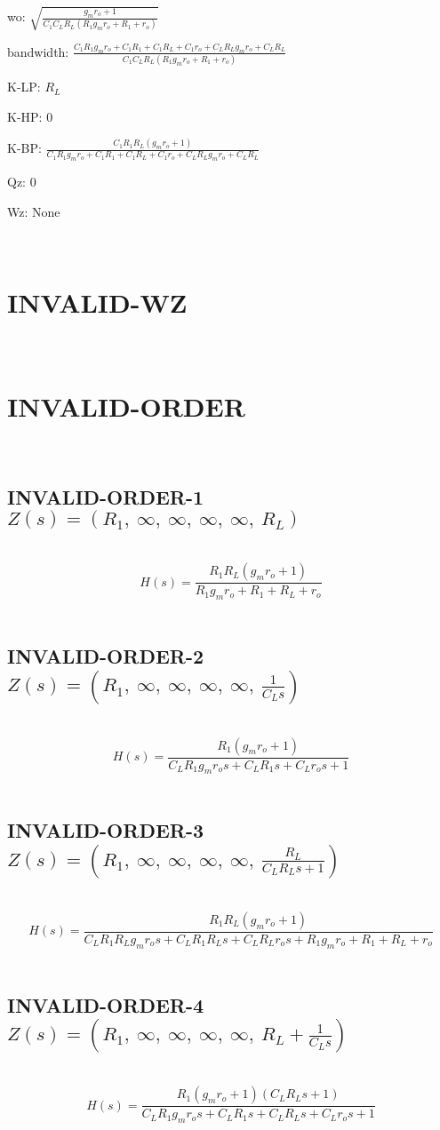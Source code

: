 \documentclass{article}
\begin{document}
wo: $\sqrt{\frac{g_{m} r_{o} + 1}{C_{1} C_{L} R_{L} \left(R_{1} g_{m} r_{o} + R_{1} + r_{o}\right)}}$\ 

bandwidth: $\frac{C_{1} R_{1} g_{m} r_{o} + C_{1} R_{1} + C_{1} R_{L} + C_{1} r_{o} + C_{L} R_{L} g_{m} r_{o} + C_{L} R_{L}}{C_{1} C_{L} R_{L} \left(R_{1} g_{m} r_{o} + R_{1} + r_{o}\right)}$\ 

K-LP: $R_{L}$\ 

K-HP: $0$\ 

K-BP: $\frac{C_{1} R_{1} R_{L} \left(g_{m} r_{o} + 1\right)}{C_{1} R_{1} g_{m} r_{o} + C_{1} R_{1} + C_{1} R_{L} + C_{1} r_{o} + C_{L} R_{L} g_{m} r_{o} + C_{L} R_{L}}$\ 

Qz: $0$\ 

Wz: $\text{None}$\ 

\ 

\section{INVALID-WZ}\ 
\section{INVALID-ORDER}\ 
\subsection{INVALID-ORDER-1 $Z(s) = \left( R_{1}, \  \infty, \  \infty, \  \infty, \  \infty, \  R_{L}\right)$ } \ 
\textbf{\[H(s) = \frac{R_{1} R_{L} \left(g_{m} r_{o} + 1\right)}{R_{1} g_{m} r_{o} + R_{1} + R_{L} + r_{o}}\] } \ 
\subsection{INVALID-ORDER-2 $Z(s) = \left( R_{1}, \  \infty, \  \infty, \  \infty, \  \infty, \  \frac{1}{C_{L} s}\right)$ } \ 
\textbf{\[H(s) = \frac{R_{1} \left(g_{m} r_{o} + 1\right)}{C_{L} R_{1} g_{m} r_{o} s + C_{L} R_{1} s + C_{L} r_{o} s + 1}\] } \ 
\subsection{INVALID-ORDER-3 $Z(s) = \left( R_{1}, \  \infty, \  \infty, \  \infty, \  \infty, \  \frac{R_{L}}{C_{L} R_{L} s + 1}\right)$ } \ 
\textbf{\[H(s) = \frac{R_{1} R_{L} \left(g_{m} r_{o} + 1\right)}{C_{L} R_{1} R_{L} g_{m} r_{o} s + C_{L} R_{1} R_{L} s + C_{L} R_{L} r_{o} s + R_{1} g_{m} r_{o} + R_{1} + R_{L} + r_{o}}\] } \ 
\subsection{INVALID-ORDER-4 $Z(s) = \left( R_{1}, \  \infty, \  \infty, \  \infty, \  \infty, \  R_{L} + \frac{1}{C_{L} s}\right)$ } \ 
\textbf{\[H(s) = \frac{R_{1} \left(g_{m} r_{o} + 1\right) \left(C_{L} R_{L} s + 1\right)}{C_{L} R_{1} g_{m} r_{o} s + C_{L} R_{1} s + C_{L} R_{L} s + C_{L} r_{o} s + 1}\] } \ 
\end{document}
